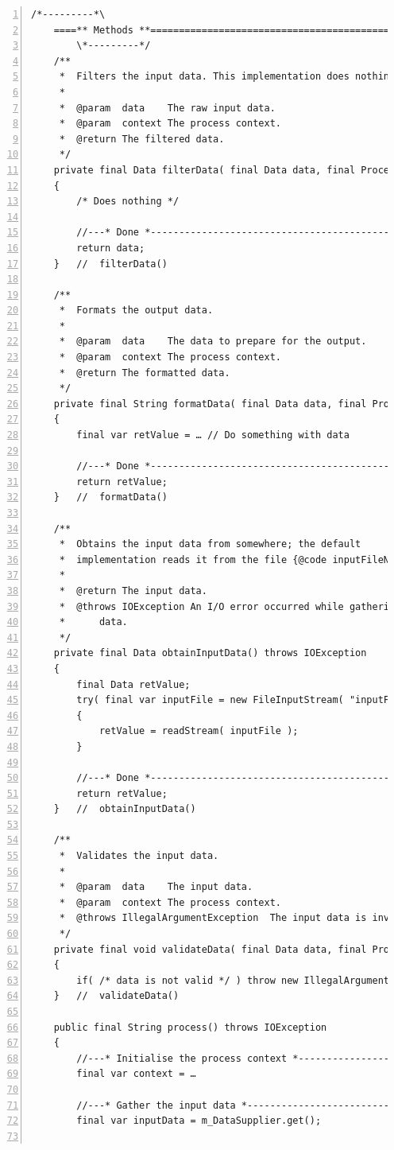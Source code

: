 \documentclass[11pt,a4paper, titlepage, parskip=half, headsepline, footsepline, cleardoublepage=current, headheight=1cm]{scrbook}
\begin{document}
\begin{lstlisting}[numbers=left]
        /*---------*\
    ====** Methods **================================================
        \*---------*/
    /**
     *  Filters the input data. This implementation does nothing.
     *
     *  @param  data    The raw input data.
     *  @param  context The process context.
     *  @return	The filtered data.
     */
    private final Data filterData( final Data data, final ProcessContext context )
    {
        /* Does nothing */

        //---* Done *------------------------------------------------
        return data;
    }   //  filterData()

    /**
     *  Formats the output data.
     *
     *  @param  data    The data to prepare for the output.
     *  @param  context The process context.
     *  @return	The formatted data.
     */
    private final String formatData( final Data data, final ProcessContext context )
    {
        final var retValue = … // Do something with data

        //---* Done *------------------------------------------------
        return retValue;
    }   //  formatData()

    /**
     *  Obtains the input data from somewhere; the default
     *  implementation reads it from the file {@code inputFileName}.
     *
     *  @return The input data.
     *  @throws IOException An I/O error occurred while gathering the
     *      data.
     */
    private final Data obtainInputData() throws IOException
    {
        final Data retValue;
        try( final var inputFile = new FileInputStream( "inputFileName" ) )
        {
            retValue = readStream( inputFile );
        }

        //---* Done *------------------------------------------------
        return retValue;
    }   //  obtainInputData()

    /**
     *  Validates the input data.
     *
     *  @param  data    The input data.
     *  @param  context The process context.
     *  @throws IllegalArgumentException  The input data is invalid.
     */
    private final void validateData( final Data data, final ProcessContext context )
    {
        if( /* data is not valid */ ) throw new IllegalArgumentException();
    }   //  validateData()

    public final String process() throws IOException
    {
        //---* Initialise the process context *----------------------
        final var context = …

        //---* Gather the input data *-------------------------------
        final var inputData = m_DataSupplier.get();


\end{lstlisting}
\end{document}
